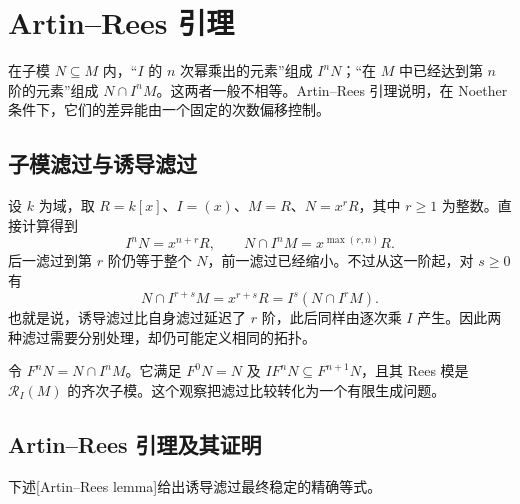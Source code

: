 
\section{Artin–Rees 引理}
\label{b3:sec:1302}


在子模 \(N\subseteq M\) 内，“\(I\) 的 \(n\) 次幂乘出的元素”组成 \(I^nN\)；“在 \(M\) 中已经达到第 \(n\) 阶的元素”组成 \(N\cap I^nM\)。这两者一般不相等。Artin–Rees 引理说明，在 Noether 条件下，它们的差异能由一个固定的次数偏移控制。

\subsection{子模滤过与诱导滤过}
\label{b3:subsec:1302:01}

设 \(k\) 为域，取 \(R=k[x]\)、\(I=(x)\)、\(M=R\)、\(N=x^rR\)，其中 \(r\ge1\) 为整数。直接计算得到
\[
	I^nN=x^{n+r}R,\qquad N\cap I^nM=x^{\max(r,n)}R.
\]
后一滤过到第 \(r\) 阶仍等于整个 \(N\)，前一滤过已经缩小。不过从这一阶起，对 \(s\ge0\) 有
\[
	N\cap I^{r+s}M=x^{r+s}R=I^s(N\cap I^rM).
\]
也就是说，诱导滤过比自身滤过延迟了 \(r\) 阶，此后同样由逐次乘 \(I\) 产生。因此两种滤过需要分别处理，却仍可能定义相同的拓扑。

\ProseParagraphBreak
令 \(F^nN=N\cap I^nM\)。它满足 \(F^0N=N\) 及 \(IF^nN\subseteq F^{n+1}N\)，且其 Rees 模是 \(\mathcal R_I(M)\) 的齐次子模。这个观察把滤过比较转化为一个有限生成问题。

\subsection{Artin–Rees 引理及其证明}
\label{b3:subsec:1302:02}

下述[Artin--Rees lemma]给出诱导滤过最终稳定的精确等式。

